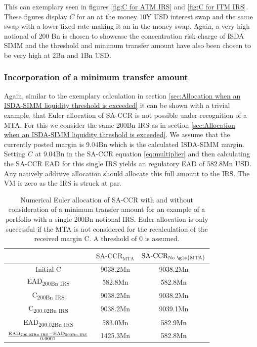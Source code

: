 \documentclass[../Thesis_AHoecherl.tex]{subfiles}
\begin{document}
    This can exemplary seen in figures \ref{fig:C for ATM IRS} and \ref{fig:C for ITM IRS}. These figures display $C$ for an at the money 10Y USD interest swap and the same swap with a lower fixed rate making it an in the money swap. Again, a very high notional of 200 Bn is chosen to showcase the concentration risk charge of ISDA SIMM and the threshold and minimum transfer amount have also been chosen to be very high at 2Bn and 1Bn USD.
    
    \subsubsection{Incorporation of a minimum transfer amount}

    Again, similar to the exemplary calculation in section \ref{sec:Allocation when an ISDA-SIMM liquidity threshold is exceeded} it can be shown with a trivial example, that Euler allocation of SA-CCR is not possible under recognition of a \gls{MTA}. 
    For this we consider the same 200Bn \gls{IRS} as in section \ref{sec:Allocation when an ISDA-SIMM liquidity threshold is exceeded}. We assume that the currently posted margin is 9.04Bn which is the calculated ISDA-SIMM margin. 
    Setting $C$ at 9.04Bn in the SA-CCR equation \ref{eq:multiplier} and then calculating the SA-CCR EAD for this single IRS yields an regulatory EAD of 582.8Mn USD. Any natively additive allocation should allocate this full amount to the IRS.
    The \gls{VM} is zero as the IRS is struck at par.
    \begin{table}[htbp]
        \centering
        \begin{tabular}{c|c|c}
            & $\text{SA-CCR}_{\text{MTA}}$ & $\text{SA-CCR}_{\text{No \gls{MTA}}}$ \\
            \toprule
            Initial C & 9038.2Mn & 9038.2Mn \\
            \midrule
            EAD\textsubscript{200Bn IRS} & 582.8Mn & 582.8Mn \\
            \midrule
            C\textsubscript{200Bn IRS} & 9038.2Mn & 9038.2Mn \\
            \midrule
            C\textsubscript{200.02Bn IRS} & 9038.2Mn & 9039.1Mn \\
            \midrule
            EAD\textsubscript{200.02Bn IRS} & 583.0Mn & 582.9Mn \\
            \midrule
            $\frac{\text{EAD\textsubscript{200.02Bn IRS}}-\text{EAD\textsubscript{200Bn IRS}}}{0.0001}$ & 1425.3Mn & 582.8Mn  \\
        \end{tabular}%
        \caption{Numerical Euler allocation of SA-CCR with and without consideration of a minimum transfer amount for an example of a portfolio with a single 200Bn notional IRS. Euler allocation is only successful if the \gls{MTA} is not considered for the recalculation of the received margin C. A threshold of 0 is assumed.}
        \label{tab:Allocate SA-CCR with MTA calculation}
    \end{table}
\end{document}
